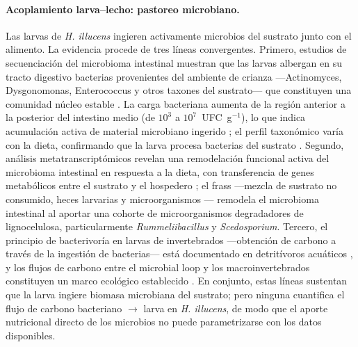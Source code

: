 \paragraph{Acoplamiento larva--lecho: pastoreo microbiano.}
Las larvas de \textit{H. illucens} ingieren activamente microbios del sustrato junto con el alimento. La evidencia procede de tres l\'ineas convergentes. Primero, estudios de secuenciaci\'on del microbioma intestinal muestran que las larvas albergan en su tracto digestivo bacterias provenientes del ambiente de crianza ---Actinomyces, Dysgonomonas, Enterococcus y otros taxones del sustrato--- que constituyen una comunidad n\'ucleo estable \parencite{klammsteinerCoreGutMicrobiome2020}. La carga bacteriana aumenta de la regi\'on anterior a la posterior del intestino medio (de $10^3$ a $10^7$~UFC~g$^{-1}$), lo que indica acumulaci\'on activa de material microbiano ingerido \parencite{brunoIntestinalMicrobiotaHermetia2019}; el perfil taxon\'omico var\'ia con la dieta, confirmando que la larva procesa bacterias del sustrato \parencite{wynantsAssessingMicrobiotaBlack2019}. Segundo, an\'alisis metatranscript\'omicos revelan una remodelaci\'on funcional activa del microbioma intestinal en respuesta a la dieta, con transferencia de genes metab\'olicos entre el sustrato y el hospedero \parencite{waltPerfectSoldierBlack2026b}; el frass ---mezcla de sustrato no consumido, heces larvarias y microorganismos \parencite{pettengillEnvironmentalFrassRemodels2026}--- remodela el microbioma intestinal al aportar una cohorte de microorganismos degradadores de lignocelulosa, particularmente \textit{Rummeliibacillus} y \textit{Scedosporium}. Tercero, el principio de bacterivor\'ia en larvas de invertebrados ---obtenci\'on de carbono a trav\'es de la ingesti\'on de bacterias--- est\'a documentado en detrit\'ivoros acu\'aticos \parencite{douilletCarbonContributionBacterivory1993}, y los flujos de carbono entre el microbial loop y los macroinvertebrados constituyen un marco ecol\'ogico establecido \parencite{vanwensemCarbonNitrogenFluxes1997}. En conjunto, estas l\'ineas sustentan que la larva ingiere biomasa microbiana del sustrato; pero ninguna cuantifica el flujo de carbono bacteriano $\to$ larva en \textit{H. illucens}, de modo que el aporte nutricional directo de los microbios no puede parametrizarse con los datos disponibles.

